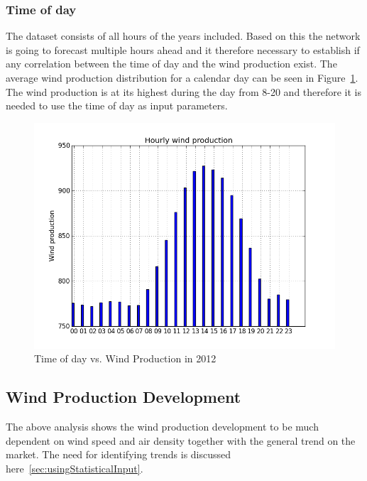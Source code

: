 \subsubsection{Time of day}
The dataset consists of all hours of the years included. Based on this the network is going to forecast multiple hours ahead and it therefore necessary to establish if any correlation between the time of day and the wind production exist. The average wind production distribution for a calendar day can be seen in Figure~\ref{fig:hourly_wind_production}. The wind production is at its highest during the day from 8-20 and therefore it is needed to use the time of day as input parameters.  

\begin{figure}[H]
\centering
\includegraphics[width=0.99\linewidth,natwidth=898,natheight=587]{billeder/hourly_wind_production.png}
\caption{Time of day vs. Wind Production in 2012}
\label{fig:hourly_wind_production}
\end{figure}

\subsection{Wind Production Development}
The above analysis shows the wind production development to be much dependent on wind speed and air density together with the general trend on the market. The need for identifying trends is discussed here~\ref{sec:usingStatisticalInput}. 

